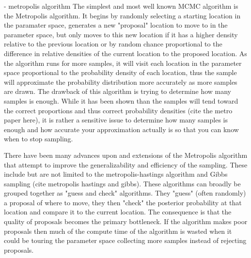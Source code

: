 - metropolis algorithm
The simplest and most well known MCMC algorithm is the Metropolis algorithm. It begins by randomly selecting a starting location in the paramater space, generates a new "proposal" location to move to in the parameter space, but only moves to this new location if it has a higher density relative to the previous location or by random chance proportional to the difference in relative densities of the current location to the proposed location. As the algorithm runs for more samples, it will visit each location in the parameter space proportional to the probability density of each location, thus the sample will approximate the probability distribution more accurately as more samples are drawn. The drawback of this algorithm is trying to determine how many samples is enough. While it has been shown than the samples will tend toward the correct proportions and thus correct probability densities (cite the metro paper here), it is rather a sensitive issue to determine how many samples is enough and how accurate your approximation actually is so that you can know when to stop sampling.

There have been many advances upon and extensions of the Metropolis algorithm that attempt to improve the generalizability and efficiency of the sampling. These include but are not limited to the metropolis-hastings algorithm and Gibbs sampling (cite metropolis hastings and gibbs). These algorithms can broadly be grouped together as "guess and check" algorithms. They "guess" (often randomly) a proposal of where to move, they then "check" the posterior probability at that location and compare it to the current location. The consequence is that the quality of proposals becomes the primary bottleneck. If the algorithm makes poor proposals then much of the compute time of the algorithm is wasted when it could be touring the parameter space collecting more samples instead of rejecting proposals.

